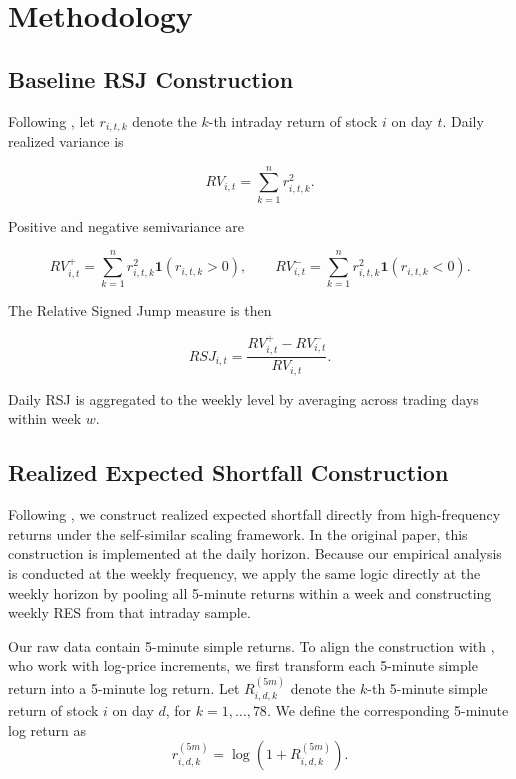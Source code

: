 \documentclass[11pt,a4paper]{article}
\begin{document}
\section{Methodology}
\subsection{Baseline RSJ Construction}

Following \citet{bollerslev2020}, let \(r_{i,t,k}\) denote the \(k\)-th
intraday return of stock \(i\) on day \(t\). Daily realized variance is

\begin{equation}
RV_{i,t} = \sum_{k=1}^{n} r_{i,t,k}^{2}.
\label{eq:rv}
\end{equation}

Positive and negative semivariance are

\begin{equation}
RV^{+}_{i,t} = \sum_{k=1}^{n} r_{i,t,k}^{2}\mathbf{1}(r_{i,t,k}>0),
\qquad
RV^{-}_{i,t} = \sum_{k=1}^{n} r_{i,t,k}^{2}\mathbf{1}(r_{i,t,k}<0).
\label{eq:semivar}
\end{equation}

The Relative Signed Jump measure is then

\begin{equation}
RSJ_{i,t} = \frac{RV^{+}_{i,t} - RV^{-}_{i,t}}{RV_{i,t}}.
\label{eq:rsj}
\end{equation}

Daily RSJ is aggregated to the weekly level by averaging across trading days
within week \(w\).

\subsection{Realized Expected Shortfall Construction}

Following \citet{Dimitriadis03072022}, we construct realized expected
shortfall directly from high-frequency returns under the
self-similar scaling framework. In the original paper, this construction
is implemented at the daily horizon. Because our empirical analysis is
conducted at the weekly frequency, we apply the same logic directly at
the weekly horizon by pooling all 5-minute returns within a week and
constructing weekly RES from that intraday sample.

Our raw data contain 5-minute simple returns. To align the construction
with \citet{Dimitriadis03072022}, who work with log-price increments, we
first transform each 5-minute simple return into a 5-minute log return.
Let \(R_{i,d,k}^{(5m)}\) denote the \(k\)-th 5-minute simple return of
stock \(i\) on day \(d\), for \(k=1,\dots,78\). We define the
corresponding 5-minute log return as
\begin{equation}
r_{i,d,k}^{(5m)}=\log\!\left(1+R_{i,d,k}^{(5m)}\right).
\label{eq:logret}
\end{equation}
\end{document}
